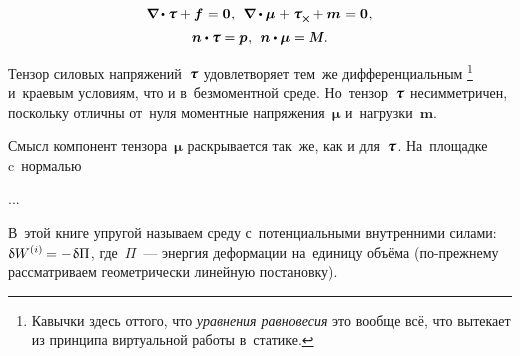 \begin{otherlanguage}{russian}
\nopagebreak\begin{equation}\label{micropolar.equilibrium:cauchy-like}
\boldnabla \hspace{-0.1ex} \dotp \mathboldtau + \bm{f} \hspace{.12ex} = \bm{0} \hspace{.1ex} ,
\:\:
\boldnabla \dotp \bm{\mu} \hspace{.1ex} + \mathboldtau_{\Xcompanion} \hspace{-0.1ex} + \bm{m} \hspace{.1ex} = \bm{0} \hspace{.1ex} ,
\end{equation}%
\nopagebreak\vspace{-1em}\begin{equation}\label{micropolar.equilibrium:boundaryconditions}
\bm{n} \dotp \mathboldtau = \bm{p} \hspace{.1ex} ,
\:\:
\bm{n} \dotp \bm{\mu} = \mathboldM \hspace{.1ex} .
\end{equation}

\vspace{-0.4em} Тензор силовых напряжений~$\mathboldtau$ удовлетворяет тем~же дифференциальным \footnote{Кавычки здесь оттого, что \emph{уравнения равновесия} это вообще всё, что вытекает из принципа виртуальной работы в~статике.} \hspace{-0.5em} и~краевым условиям, что и в~безмоментной среде. Но~тензор~$\mathboldtau$ несимметричен, поскольку отличны от~нуля моментные напряжения~$\bm{\mu}$ и~нагрузки~$\bm{m}$.

Смысл компонент тензора~$\bm{\mu}$ раскрывается так~же, как и для~$\mathboldtau$. На~площадке c~нормалью

...






В~этой книге упругой называем среду с~потенциальными внутренними силами: ${\variation{\internalwork} = - \hspace{.16ex} \variation{\Pi}}$, где~$\Pi$~--- энергия деформации на~единицу объёма (по\hbox{-}прежнему рассматриваем геометрически линейную постановку).


\end{otherlanguage}
